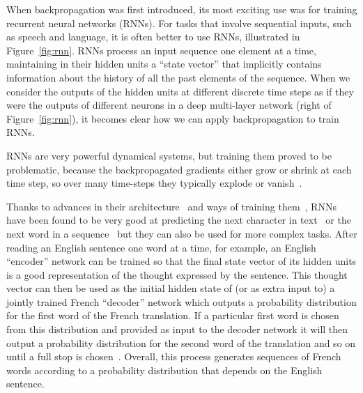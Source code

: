 \documentclass[10pts]{article}
\begin{document}
When backpropagation was first introduced, its most exciting use was
for training recurrent neural networks (RNNs). 
For tasks that involve sequential inputs, such as speech and language,
it is often better to use RNNs, illustrated in
Figure~\ref{fig:rnn}.  RNNs process an input
sequence one element at a time, maintaining in their hidden units a
``state vector'' that implicitly contains information about the
history of all the past elements of the sequence.  
When we consider the outputs of
the hidden units at different discrete time steps as if they were the
outputs of different neurons in a deep multi-layer network (right of
Figure~\ref{fig:rnn}), it becomes
clear how we can apply backpropagation to train RNNs.

RNNs are very powerful dynamical systems, but
training them proved to be problematic, because the
backpropagated gradients either grow or shrink at each time step, so
over many time-steps they typically explode or
vanish~\citep{Hochreiter91-small,Bengio-et-al-TNN1994}.

Thanks to advances in their architecture~\citep{Hochreiter+Schmidhuber-1997,ElHihi+Bengio-nips8-small} 
and ways of training them~\citep{Sutskever-thesis2012,Pascanu+al-ICML2013-small}, RNNs
have been found to be very good at predicting the next character in
text~\citep{Sutskever-et-al-ICML2011} or the next word in a
sequence~\citep{Mikolov-et-al-NIPS2013} but they can also be used for
more complex tasks.  After reading an English sentence one word at a
time, for example, an English ``encoder'' network can be trained so
that the final state vector of its hidden units is a good
representation of the thought expressed by the sentence.  This thought
vector can then be used as the initial hidden state of (or as extra
input to) a jointly trained French ``decoder'' network which outputs a
probability distribution for the first word of the French
translation. If a particular first word is chosen from this
distribution and provided as input to the decoder network it will then
output a probability distribution for the second word of the
translation and so on until a full stop is
chosen~\citep{Bahdanau-et-al-ICLR2015-small,Sutskever-et-al-NIPS2014}.
Overall, this process generates sequences of French words according to
a probability distribution that depends on the English sentence.
\end{document}
